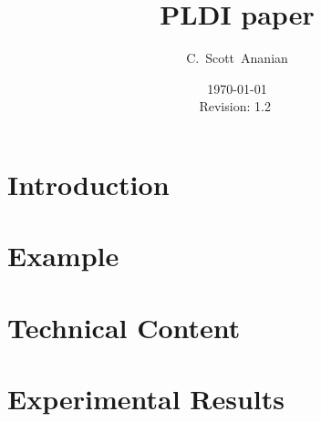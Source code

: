 \documentclass[notitlepage,twocolumn,twoside]{article}
\author{C.~Scott~Ananian}
\title{PLDI paper}
\date{\today \\ $ $Revision: 1.2 $ $}
\begin{document}

\maketitle

\section{Introduction}

\section{Example}

\section{Technical Content}

\section{Experimental Results}

\nocite{*}

\end{document}
